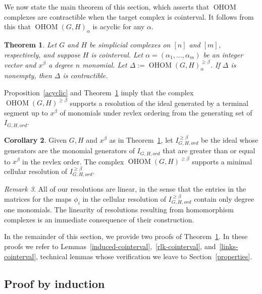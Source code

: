 \documentclass[11pt]{amsart}
\newtheorem{theorem}{Theorem}[section]
\theoremstyle{definition}
\newtheorem{corollary}[theorem]{Corollary}
\numberwithin{equation}{section}
\theoremstyle{remark}
\newtheorem{remark}[theorem]{Remark}
\numberwithin{equation}{section}
\begin{document}
We now state the main theorem of this section, which asserts that $\operatorname{OHOM}$ complexes are contractible when the target complex is cointerval.
It follows from this that $\operatorname{OHOM}(G,H)_{\alpha}$ is acyclic for any $\alpha$.

\begin{theorem}  \label{main} 
Let $G$ and $H$ be simplicial complexes on $[n]$ and $[m]$, respectively, and suppose $H$ is cointerval. 
Let $\alpha = (\alpha_1, \ldots, \alpha_m)$ be an integer vector and $x^\beta$ a degree $n$ monomial.  
Let $\Delta := \operatorname{OHOM}(G,H)_{\alpha}^{\geq \beta}$. 
If $\Delta$ is nonempty, then $\Delta$ is contractible.
\end{theorem}

Proposition~\ref{acyclic} and Theorem~\ref{main} imply that the complex $\operatorname{OHOM}(G,H)^{\geq \beta}$ supports a resolution of the ideal generated by a terminal segment up to $x^\beta$ of monomials under revlex ordering from the generating set of $I_{G,H,ord}$.

\begin{corollary}\label{maincor}
Given $G,H$ and $x^\beta$ as in Theorem~\ref{main}, let $I^{\geq \beta}_{G,H,ord}$ be the ideal whose generators are the monomial generators of $I_{G,H,ord}$ that are greater than or equal to $x^\beta$ in the revlex order.
The complex $\operatorname{OHOM}(G,H)^{\geq \beta}$ supports a minimal cellular resolution of $I^{\geq \beta}_{G,H,ord}$.
\end{corollary}

\begin{remark}
All of our resolutions are linear, in the sense that the entries in the matrices for the maps $\phi_i$ in the cellular resolution of $I^{\geq \beta}_{G,H,ord}$ contain only degree one monomials.
The linearity of resolutions resulting from homomorphism complexes is an immediate consequence of their construction.
\end{remark}

In the remainder of this section, we provide two proofs of Theorem~\ref{main}.
In these proofs we refer to Lemmas~\ref{induced-cointerval},~\ref{rlk-cointerval}, and~\ref{links-cointerval}, technical lemmas whose verification we leave to Section~\ref{properties}.

\subsection{Proof by induction}
\end{document}
